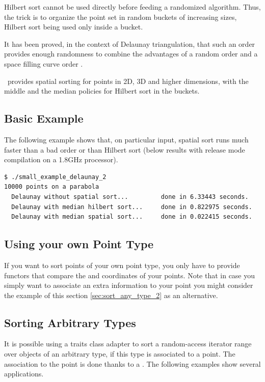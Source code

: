 Hilbert sort cannot be used directly before feeding a randomized algorithm.
Thus, the trick is to organize the point set in random buckets of increasing
sizes, Hilbert sort being used only inside a bucket.

It has been proved, in the context of Delaunay triangulation, that
such an order provides enough randomness to combine the advantages of a random
 order and a space filling curve order \cite{acr-icb-03}.


\cgal\ provides spatial sorting for points in 2D, 3D and higher dimensions,
with the middle and the median policies for Hilbert sort in the buckets.

\subsection{Basic Example}

The following example shows that, on particular input, spatial sort
runs much faster than a bad order or than Hilbert sort (below results
with release mode compilation on a 1.8GHz processor).
\begin{verbatim}
$ ./small_example_delaunay_2 
10000 points on a parabola
  Delaunay without spatial sort...         done in 6.33443 seconds.
  Delaunay with median hilbert sort...     done in 0.822975 seconds.
  Delaunay with median spatial sort...     done in 0.022415 seconds.
\end{verbatim}



\subsection{Using your own Point Type}
If you want to sort points of your own point type,
you only have to provide functors that compare
the  and  coordinates of your points. Note that in case you simply want
to associate an extra information to your point you might consider the example of this section
\ref{sec:sort_any_type_2}
as an alternative.


\subsection{Sorting Arbitrary Types}
\label{sec:sort_any_type}
It is possible using a traits class adapter to sort a random-access
iterator range over objects of an arbitrary type, if this type is associated
to a point. The association to the point is done thanks to a 
.
The following examples show several applications.

